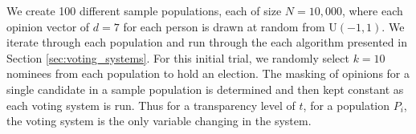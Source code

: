 We create 100 different sample populations, each of size $N = 10,000$, where each opinion vector of $d=7$ for each person is drawn at random from U$(-1,1)$.
We iterate through each population and run through the each algorithm presented in Section \ref{sec:voting_systems}.
For this initial trial, we randomly select $k=10$ nominees from each population to hold an election.
The masking of opinions for a single candidate in a sample population is determined and then kept constant as each voting system is run.
Thus for a transparency level of $t$, for a population $P_i$, the voting system is the only variable changing in the system.
